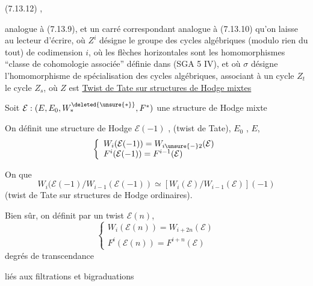 (7.13.12)\quad
{},

 analogue à (7.13.9), et un carré correspondant analogue à (7.13.10) qu'on laisse au lecteur d'écrire, où $Z^i$ désigne le groupe des cycles algébriques (modulo rien du tout) de codimension $i$,  où les flèches horizontales sont les homomorphismes ``classe de cohomologie associée'' définie dans (SGA 5 IV), et où $\sigma$ désigne l'homomorphisme de spécialisation des cycles algébriques, associant à un cycle $Z_t$ le cycle $Z_s$, où $Z$ est
\uline{Twist de Tate sur structures de Hodge mixtes}

Soit $\mathcal E:(E,E_0,W_*^{\deleted{\unsure{*}}},F^*)$ une structure de Hodge mixte

On définit une structure de Hodge $\mathcal E(-1)$ , (twist de Tate),  $E_0$ ,  $E$,
\[
\left\{\begin{array}{l}
W_i(\mathcal E(-1))=W_{i\unsure{-}2}(\mathcal E)\\
F^i(\mathcal E(-1))=F^{i-1}(\mathcal E)
\end{array}\right.
\]

On  que
\[
W_i(\mathcal E(-1)/W_{i-1}(\mathcal E(-1))\simeq
[W_i(\mathcal E)/W_{i-1}(\mathcal E)](-1)
\]
(twist de Tate sur structures de Hodge ordinaires).

Bien sûr, on définit par  un twist $\mathcal E(n)$,
\[
\left\{\begin{array}{l}
W_i(\mathcal E(n))=W_{i+2n}(\mathcal E)\\
F^i(\mathcal E(n))=F^{i+n}(\mathcal E)
\end{array}\right.
\]
degrés de transcendance

liés aux filtrations et bigraduations

